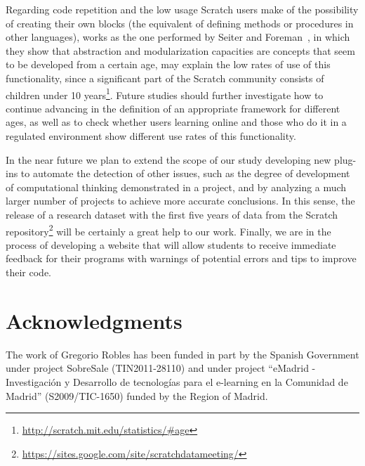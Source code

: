 \documentclass[conference]{format/IEEEtran}
\begin{document}
Regarding code repetition and the low usage Scratch users make of the possibility of creating their own blocks (the equivalent of defining methods or procedures in other languages), works as the one performed by Seiter and Foreman~\cite {seiter2013modeling}, in which they show that abstraction and modularization capacities are concepts that seem to be developed from a certain age, may explain the low rates of use of this functionality, since a significant part of the Scratch community consists of children under 10 years\footnote{\url{http://scratch.mit.edu/statistics/#age}}. Future studies should further investigate how to continue advancing in the definition of an appropriate framework for different ages, as well as to check whether users learning online and those who do it in a regulated environment show different use rates of this functionality.


In the near future we plan to extend the scope of our study developing new plug-ins to automate the detection of other issues, such as the degree of development of computational thinking demonstrated in a project, and by analyzing a much larger number of projects to achieve more accurate conclusions. In this sense, the release of a research dataset with the first five years of data from the Scratch repository\footnote{\url{https://sites.google.com/site/scratchdatameeting/}} will be certainly a great help to our work. Finally, we are in the process of developing a website that will allow students to receive immediate feedback for their programs with warnings of potential errors and tips to improve their code.

\section*{Acknowledgments}

The work of Gregorio Robles has
been funded in part by the Spanish Government under project 
SobreSale (TIN2011-28110) and under project ``eMadrid - Investigación y Desarrollo de tecnologías para el e-learning en la Comunidad de Madrid'' (S2009/TIC-1650) funded by the Region of Madrid.



\end{document}
